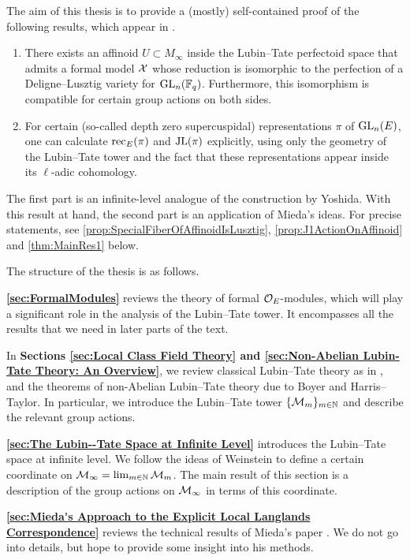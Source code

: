 \documentclass[../main.tex]{subfiles}
\begin{document}
The aim of this thesis is to provide a (mostly) self-contained proof of
the following results, which appear in \cite[Section 5]{mieda2016geometric}. 
\begin{thm*}
  \leavevmode \begin{enumerate}
    \item There exists an affinoid $U \subset M_\infty$ inside the Lubin--Tate perfectoid space that admits a formal model $\mathcal{X}$ whose reduction is isomorphic to the
      perfection of a Deligne--Lusztig variety for $\operatorname{GL}_n(\mathbb{F}_q)$. Furthermore,
      this isomorphism is compatible for certain group actions on both sides.
    \item For certain (so-called depth zero supercuspidal) representations $\pi$ of $\operatorname{GL}_n(E)$, one can calculate $\mathrm{rec}_E(\pi)$ and $\mathrm{JL}(\pi)$
      explicitly, using only the geometry of the Lubin--Tate tower and the fact that these representations appear inside its $\ell$-adic cohomology.
  \end{enumerate}
\end{thm*}
The first part is an infinite-level analogue of the construction by Yoshida.
With this result at hand, the second part is an application of Mieda's ideas.
For precise statements, see \cref{prop:SpecialFiberOfAffinoidIsLusztig},
\cref{prop:J1ActionOnAffinoid} and \cref{thm:MainRes1} below. 

The structure of the thesis is as follows.

\textbf{\cref{sec:FormalModules}} reviews the theory of formal $\mathcal{O}_E$-modules, which
will play a significant role in the analysis of the Lubin--Tate tower. It encompasses
all the results that we need in later parts of the text.

In \textbf{Sections \ref{sec:Local Class Field Theory}  and
\ref{sec:Non-Abelian Lubin-Tate Theory: An Overview}}, we review classical
Lubin--Tate theory as in
\cite{LubinTateFormalMult}, and the theorems of non-Abelian Lubin--Tate theory
due to Boyer and Harris--Taylor. In particular,
we introduce the Lubin--Tate tower $\{\mathcal{M}_m\}_{m \in \mathbb{N}}$ and describe the
relevant group actions.

\textbf{\cref{sec:The Lubin--Tate Space at Infinite Level}} introduces the
Lubin--Tate space at infinite level. 
We follow the ideas of Weinstein to define a certain coordinate on $\mathcal{M}_\infty = 
\lim_{m \in \mathbb{N}} \mathcal{M}_m$. The main result of this section is a description of
the group actions on $\mathcal{M}_\infty$ in terms of this coordinate. 

\textbf{\cref{sec:Mieda's Approach to the Explicit Local Langlands
Correspondence}} reviews the technical results of Mieda's paper
\cite{mieda2016geometric}. We do not go into details, but hope to provide some
insight into his methods. 
\end{document}
